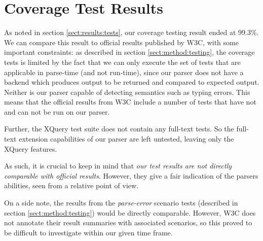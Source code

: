 \section{Coverage Test Results}
\label{sect:discussion:coverageResults}
As noted in section \ref{sect:results:tests}, our coverage testing result ended
at 99.3\%. We can compare this result to official results published by W3C, with
some  important constraints: as described in section \ref{sect:method:testing},
the coverage tests is limited by the fact that we can only execute the set of
tests that are applicable in parse-time (and not run-time), since our parser
does not have a backend which produces output to be returned and compared to
expected output. Neither is our parser capable of detecting semantics such as
typing errors. This means that the official results from W3C include a number
of tests that have not and can not be run on our parser.

Further, the XQuery test suite does not contain any full-text tests. So the
full-text extension capabilities of our parser are left untested, leaving only the XQuery features.

As such, it is crucial to keep in mind that \emph{our test results are not directly
comparable with official results}. However, they give a fair indication of the
parsers abilities, seen from a relative point of view.

On a side note, the results from the \emph{parse-error} scenario tests
(described in  section \ref{sect:method:testing}) would be directly comparable.
However, W3C does not annotate their result summaries with associated scenarios,
so this proved to be difficult to investigate within our given time frame.

